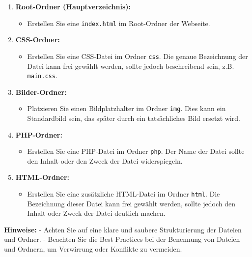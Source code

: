 \documentclass[12pt,a4paper]{scrartcl}
\newcommand{\tightlist}{
  \setlength{\itemsep}{0pt}\setlength{\parskip}{0pt}
}
\begin{document}
\begin{enumerate}
\def\labelenumi{\arabic{enumi}.}
\tightlist
\item
  \textbf{Root-Ordner (Hauptverzeichnis):}

  \begin{itemize}
  \tightlist
  \item
    Erstellen Sie eine {\lstinline!index.html!} im
    Root-Ordner der Webseite.
  \end{itemize}
\item
  \textbf{CSS-Ordner:}

  \begin{itemize}
  \tightlist
  \item
    Erstellen Sie eine CSS-Datei im Ordner
    {\lstinline!css!}. Die genaue Bezeichnung der Datei kann
    frei gewählt werden, sollte jedoch beschreibend sein, z.B.
    {\lstinline!main.css!}.
  \end{itemize}
\item
  \textbf{Bilder-Ordner:}

  \begin{itemize}
  \tightlist
  \item
    Platzieren Sie einen Bildplatzhalter im Ordner
    {\lstinline!img!}. Dies kann ein Standardbild sein, das
    später durch ein tatsächliches Bild ersetzt wird.
  \end{itemize}
\item
  \textbf{PHP-Ordner:}

  \begin{itemize}
  \tightlist
  \item
    Erstellen Sie eine PHP-Datei im Ordner
    {\lstinline!php!}. Der Name der Datei sollte den Inhalt
    oder den Zweck der Datei widerspiegeln.
  \end{itemize}
\item
  \textbf{HTML-Ordner:}

  \begin{itemize}
  \tightlist
  \item
    Erstellen Sie eine zusätzliche HTML-Datei im Ordner
    {\lstinline!html!}. Die Bezeichnung dieser Datei kann
    frei gewählt werden, sollte jedoch den Inhalt oder Zweck der Datei
    deutlich machen.
  \end{itemize}
\end{enumerate}

\textbf{Hinweise:} - Achten Sie auf eine klare und saubere
Strukturierung der Dateien und Ordner. - Beachten Sie die Best Practices
bei der Benennung von Dateien und Ordnern, um Verwirrung oder Konflikte
zu vermeiden.
\end{document}
